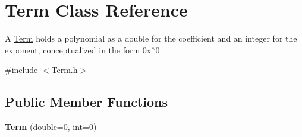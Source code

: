 \hypertarget{classTerm}{
\section{Term Class Reference}
\label{classTerm}
}


A \hyperlink{classTerm}{Term} holds a polynomial as a double for the coefficient and an integer for the exponent, conceptualized in the form 0x$^\wedge$0.  


{\ttfamily \#include $<$Term.h$>$}\subsection*{Public Member Functions}
\begin{DoxyCompactItemize}
\item 
\hypertarget{classTerm_aa72ef129269040b50836346dcae32154}{
{\bfseries Term} (double=0, int=0)}
\label{classTerm_aa72ef129269040b50836346dcae32154}


\end{DoxyCompactItemize}
